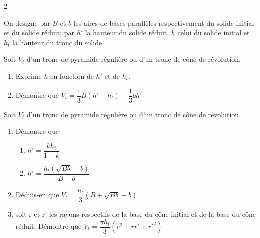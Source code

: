 \begin{multicols*}{2}
  	On désigne par $B$ et $b$ les aires de bases parallèles respectivement du solide initial et du solide réduit; par $h'$ la hauteur du solide réduit, $h$ celui du solide initial et $h_{t}$ la hauteur du tronc du solide.
  	
  	Soit $V_{t}$ d’un tronc de pyramide régulière ou d'un tronc de cône de révolution.
  	\begin{enumerate}
  		\item Exprime $h$ en fonction de $h'$  et de $h_{t}$.
  		\item  Démontre que $V_{t}=\dfrac{1}{3}B\left(h'+h_{t}\right)-\dfrac{1}{3}bh'$
  	\end{enumerate}
  	\dures
  	 
  	
  	Soit $V_{t}$ d’un tronc de pyramide régulière ou d'un tronc de cône de révolution.
  	\begin{enumerate}
  		\item Démontre que
  		\begin{enumerate}
  			\item  $h'=\dfrac{kh_{t}}{1-k}$
  			\item  $h'=\dfrac{h_{t}\left(\sqrt{Bb}+b\right)}{B-b}$
  		\end{enumerate}
  		\item Déduis-en que $V_{t}=\dfrac{h_{t}}{3}\left(B+\sqrt{Bb}+b\right)$
  		\item soit r et r' les rayons respectifs de la base du cône initial et de la base du cône réduit. Démontre que $V_{t}=\dfrac{\pi h_{t}}{3}\left(r^2+rr'+r'^2\right)$
  	\end{enumerate}
  	\dures
  	 
\end{multicols*}
